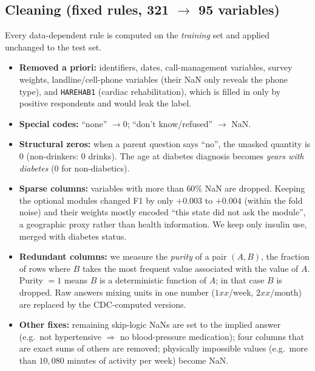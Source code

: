 \documentclass[10pt,conference,compsocconf]{IEEEtran}
\begin{document}
\subsection{Cleaning (fixed rules, 321 $\rightarrow$ 95 variables)}
Every data-dependent rule is computed on the \emph{training} set and applied unchanged to the test set.
\begin{itemize}
\item \textbf{Removed a priori:} identifiers, dates, call-management variables, survey weights, landline/cell-phone variables (their NaN only reveals the phone type), and \texttt{HAREHAB1} (cardiac rehabilitation), which is filled in only by positive respondents and would leak the label.
\item \textbf{Special codes:} ``none'' $\rightarrow 0$; ``don't know/refused'' $\rightarrow$ NaN.
\item \textbf{Structural zeros:} when a parent question says ``no'', the unasked quantity is $0$ (non-drinkers: $0$ drinks). The age at diabetes diagnosis becomes \emph{years with diabetes} ($0$ for non-diabetics).
\item \textbf{Sparse columns:} variables with more than $60\%$ NaN are dropped. Keeping the optional modules changed F1 by only $+0.003$ to $+0.004$ (within the fold noise) and their weights mostly encoded ``this state did not ask the module'', a geographic proxy rather than health information. We keep only insulin use, merged with diabetes status.
\item \textbf{Redundant columns:} we measure the \emph{purity} of a pair $(A,B)$, the fraction of rows where $B$ takes the most frequent value associated with the value of $A$. Purity $=1$ means $B$ is a deterministic function of $A$; in that case $B$ is dropped. Raw answers mixing units in one number ($1xx$/week, $2xx$/month) are replaced by the CDC-computed versions.
\item \textbf{Other fixes:} remaining skip-logic NaNs are set to the implied answer (e.g.\ not hypertensive $\Rightarrow$ no blood-pressure medication); four columns that are exact sums of others are removed; physically impossible values (e.g.\ more than $10{,}080$ minutes of activity per week) become NaN.
\end{itemize}
\end{document}
